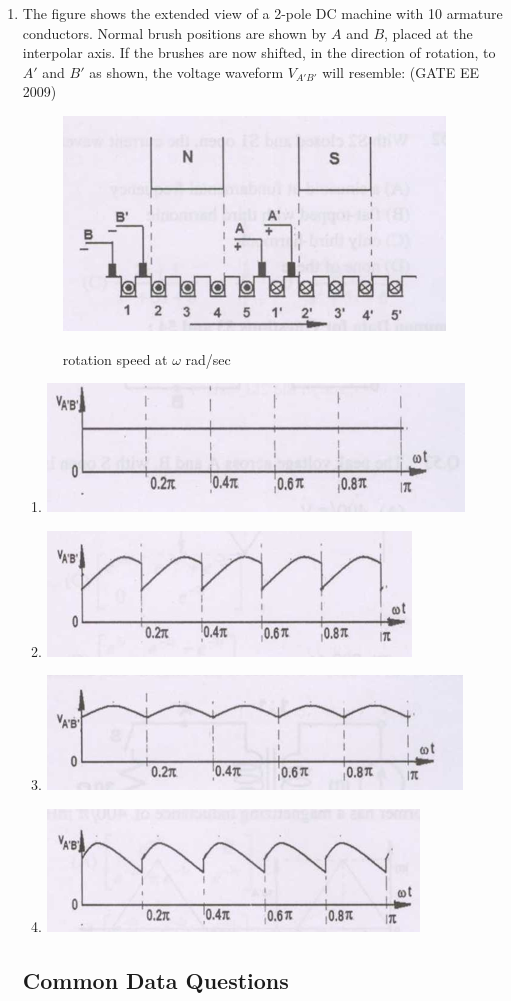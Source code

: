 \documentclass[journal,12pt,onecolumn]{IEEEtran}
\theoremstyle{remark}
\begin{document}
\begin{flushleft}
\begin{enumerate}
\item  The figure shows the extended view of a 2-pole DC machine with 10 armature conductors.
Normal brush positions are shown by \(A\) and \(B\), placed at the interpolar axis. If the brushes are now 
shifted, in the direction of rotation, to \(A'\) and \(B'\) as shown, the voltage waveform \(V_{A'B'}\) will resemble:
\hfill(GATE EE 2009)
\begin{figure}[h!]
    \centering
    \includegraphics[width=0.5\columnwidth]{figs/Screenshot 2025-08-09 104422.png}
    \label{fig:placeholder}
    \caption{rotation speed at $\omega$ rad/sec}
\end{figure}

\begin{enumerate}
     

\item  \includegraphics[width=0.3\columnwidth]{figs/Screenshot 2025-08-09 104456.png} 
\item  \includegraphics[width=0.3\columnwidth]{figs/Screenshot 2025-08-09 104451.png} 
\item  \includegraphics[width=0.3\columnwidth]{figs/Screenshot 2025-08-09 104444.png} 
\item  \includegraphics[width=0.3\columnwidth]{figs/Screenshot 2025-08-09 104436.png}
\end{enumerate}

\subsection*{Common Data Questions}


\end{enumerate}
\end{flushleft}
\end{document}
